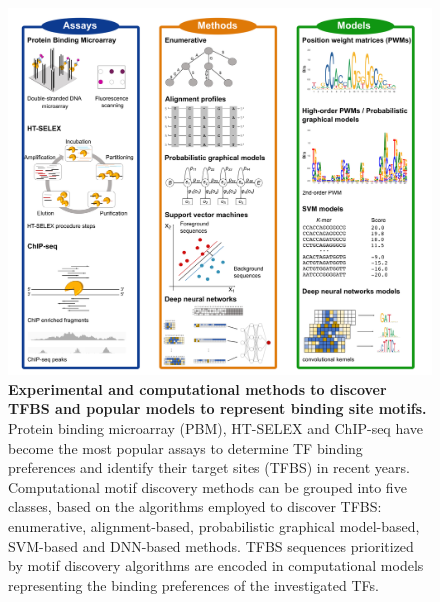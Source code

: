 \documentclass[a4paper, titlepage, openright]{book}
\begin{document}
\begin{figure}
	\centering
	\includegraphics[width=\textwidth]{figures/md.png}
	\caption[Experimental and computational methods to discover TFBS and popular models to represent binding site motifs.]{\textbf{Experimental and computational methods to discover TFBS and popular models to represent binding site motifs.} Protein binding microarray (PBM), HT-SELEX and ChIP-seq have become the most popular assays to determine TF binding preferences and identify their target sites (TFBS) in recent years. Computational motif discovery methods can be grouped into five classes, based on the algorithms employed to discover TFBS: enumerative, alignment-based, probabilistic graphical model-based, SVM-based and DNN-based methods. TFBS sequences prioritized by motif discovery algorithms are encoded in computational models representing the binding preferences of the investigated TFs.}
	\label{fig:md}
\end{figure}
\end{document}

